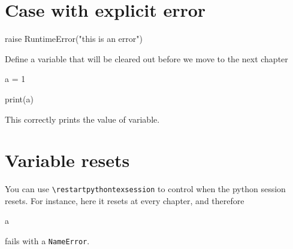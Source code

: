 \documentclass{book}
\begin{document}
\chapter{Case with explicit error}

\begin{pycell}
raise RuntimeError("this is an error")
\end{pycell}

Define a variable that will be cleared out before we move to the next chapter

\begin{pycell}
a = 1
\end{pycell}

\begin{pycell}
print(a)
\end{pycell}

This correctly prints the value of variable.

\chapter{Variable resets}

You can use \texttt{\textbackslash restartpythontexsession} to control when the python session resets. For instance, here it resets at every chapter, and therefore

\begin{pycell}
a
\end{pycell}

fails with a \texttt{NameError}.

\ifPythonTeXLoaded
\else
\fi
\end{document}
